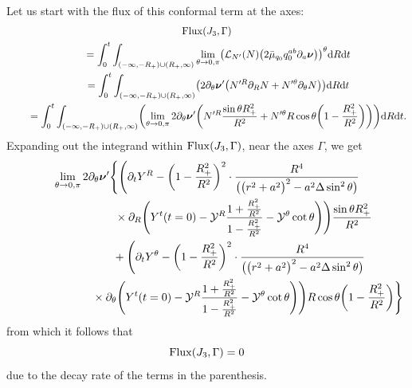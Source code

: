 \documentclass[pdftex]{sigma}
\def\ptl{\partial}%
\def\mbo#1{\boldsymbol{#1}}%
\numberwithin{equation}{section}
\begin{document}
Let us start with the flux of this conformal term at the axes:
\begin{gather*}
 {\rm Flux} (J_3, \Gamma) \\
 \qquad{} = \int^t_0 \int_{(-\infty, -R_+) \cup (R_+, \infty)} \lim_{\theta \to 0, \pi} \bigl(\mathcal{L}_{N'} (N) \bigl(2 \bar{\mu}_{q_0}q^{ab}_0 \ptl_a \mbo{\nu}\bigr) \bigr)^\theta {\rm d}R {\rm d}t \notag\\
 \qquad{} = \int^t_0 \int_{(-\infty, -R_+) \cup (R_+, \infty)} \bigl( 2 \ptl_\theta \mbo{\nu}' \bigl(N'^R \ptl_R N + N'^\theta \ptl_\theta N\bigr) \bigr) {\rm d}R {\rm d}t \notag\\
 \qquad{} = \int^t_0 \int_{(-\infty, -R_+) \cup (R_+, \infty)} \biggl(\lim_{\theta \to 0, \pi} 2 \ptl_\theta \mbo{\nu}' \biggl(N'^R \frac{\sin \theta R^2_+}{R^2} + N'^\theta R \cos \theta\biggl(1-\frac{R^2_+}{R^2} \biggr) \biggr)\biggr) {\rm d}R {\rm d}t.
\end{gather*}
Expanding out the integrand within ${\rm Flux} (J_3, \Gamma) $, near the axes $\Gamma$, we get
\begin{gather*}
 \lim_{\theta \to 0, \pi} 2 \ptl_\theta \mbo{\nu}' \Biggl\{ \Biggl(\ptl_t Y^R -\biggl(1 - \frac{R^2_+}{R^2} \biggr)^2 \cdot \frac{R^4}{ \bigl(\bigl(r^2+a^2\bigr)^2 -a^2 \Delta \sin^2 \theta\bigr)} \notag\\
 \hphantom{\lim_{\theta \to 0, \pi} 2 \ptl_\theta \mbo{\nu}' \Biggl\{ \Biggl(}{}
 \times \ptl_R \Biggl(Y^t(t=0) - \mathcal{Y}^R \frac{1+ \frac{R^2_+}{R^2}}{1-\frac{R^2_+}{R^2}} - \mathcal{Y}^\theta \cot \theta \Biggr) \Biggr)\frac{\sin \theta R^2_+}{R^2} \notag\\
\hphantom{ \lim_{\theta \to 0, \pi} 2 \ptl_\theta \mbo{\nu}' \Biggl\{}{} + \Biggl(\ptl_t Y^\theta - \biggl(1- \frac{R^2_+}{R^2}\biggr)^2 \cdot \frac{R^4}{ \bigl(\bigl(r^2+a^2\bigr)^2 -a^2 \Delta
	\sin^2 \theta \bigr)} \notag\\
\hphantom{ \lim_{\theta \to 0, \pi} 2 \ptl_\theta \mbo{\nu}' \Biggl\{ +\Biggl(}{} \times \ptl_\theta \Biggl(Y^t (t=0) - \mathcal{Y}^R \frac{1 + \frac{R^2_+}{R^2}} {{1-\frac{R^2_+}{R^2}} } - \mathcal{Y}^ \theta \cot \theta \Biggr) \Biggr) R \cos \theta \biggl(1-\frac{R^2_+}{R^2}\biggr) \Biggr\}
\end{gather*}
from which it follows that
\[
{\rm Flux} (J_3, \Gamma)= 0
\]
due to the decay rate of the terms in the parenthesis.
\end{document}
